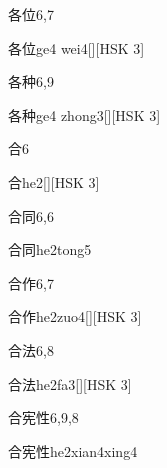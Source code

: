 \begin{entry}{各位}{6,7}
  \begin{phonetics}{各位}{ge4 wei4}[][HSK 3]
  \end{phonetics}
\end{entry}

\begin{entry}{各种}{6,9}
  \begin{phonetics}{各种}{ge4 zhong3}[][HSK 3]
  \end{phonetics}
\end{entry}

\begin{entry}{合}{6}
  \begin{phonetics}{合}{he2}[][HSK 3]
  \end{phonetics}
\end{entry}

\begin{entry}{合同}{6,6}
  \begin{phonetics}{合同}{he2tong5}
  \end{phonetics}
\end{entry}

\begin{entry}{合作}{6,7}
  \begin{phonetics}{合作}{he2zuo4}[][HSK 3]
  \end{phonetics}
\end{entry}

\begin{entry}{合法}{6,8}
  \begin{phonetics}{合法}{he2fa3}[][HSK 3]
  \end{phonetics}
\end{entry}

\begin{entry}{合宪性}{6,9,8}
  \begin{phonetics}{合宪性}{he2xian4xing4}
  \end{phonetics}
\end{entry}

